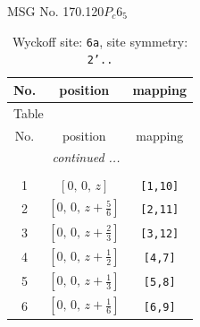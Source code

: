\documentclass[fleqn,8pt]{jsarticle}
\begin{document}
\setcounter{MaxMatrixCols}{32}

\renewcommand{\tablename}{Table~}
\renewcommand{\figurename}{Figure~}
\begin{center}
\LARGE
MSG No. 170.120\quad$P_{c}6_{5}$
\end{center}
\renewcommand{\arraystretch}{1.2}
\begin{longtable}{ccc}
\caption{Wyckoff site: {\tt 6a}, site symmetry: {\tt 2'..}}
 \\
 \hline \hline
No. & position & mapping \\ \hline \endfirsthead

\multicolumn{2}{l}{\tablename\ \thetable{}} \\
 \hline \hline
No. & position & mapping \\ \hline \endhead

 \hline \hline
\multicolumn{2}{r}{\footnotesize\it continued ...} \\ \endfoot

 \hline \hline
\multicolumn{2}{r}{} \\ \endlastfoot

1 & $\left[ 0,\, 0,\, z \right]$ & {\tt [1,10]} \\ \hline
2 & $\left[ 0,\, 0,\, z + \frac{5}{6} \right]$ & {\tt [2,11]} \\ \hline
3 & $\left[ 0,\, 0,\, z + \frac{2}{3} \right]$ & {\tt [3,12]} \\ \hline
4 & $\left[ 0,\, 0,\, z + \frac{1}{2} \right]$ & {\tt [4,7]} \\ \hline
5 & $\left[ 0,\, 0,\, z + \frac{1}{3} \right]$ & {\tt [5,8]} \\ \hline
6 & $\left[ 0,\, 0,\, z + \frac{1}{6} \right]$ & {\tt [6,9]} \\
\end{longtable}
\renewcommand{\arraystretch}{1.2}
\end{document}
